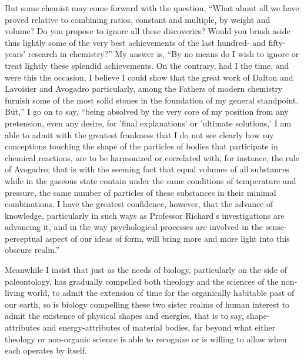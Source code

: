 \documentclass[a4paper, 11pt, oneside, polutonikogreek, english]{article}
\begin{document}
But some chemist may come forward with the question, ``What about all we have proved relative to combining ratios, constant and multiple, by weight and volume? Do you propose to ignore all these discoveries? Would you brush aside thus lightly some of the very best achievements of the last hundred- and fifty-years’ research in chemistry?'' My answer is, ``By no means do I wish to ignore or treat lightly these splendid achievements. On the contrary, had I the time, and were this the occasion, I believe I could show that the great work of Dalton and Lavoisier and Avogadro particularly, among the Fathers of modern chemistry furnish some of the most solid stones in the foundation of my general standpoint. But,'' I go on to say, ``being absolved by the very core of my position from any pretension, even any desire, for 'final explanations' or 'ultimate solutions,' I am able to admit with the greatest frankness that I do not see clearly how my conceptions touching the shape of the particles of bodies that participate in chemical reactions, are to be harmonized or correlated with, for instance, the rule of Avogadro; that is with the seeming fact that equal volumes of all substances while in the gaseous state contain under the same conditions of temperature and pressure, the same number of particles of these substances in their minimal combinations. I have the greatest confidence, however, that the advance of knowledge, particularly in such ways as Professor Richard's investigations are advancing it, and in the way psychological processes are involved in the sense-perceptual aspect of our ideas of form, will bring more and more light into this obscure realm.''

Meanwhile I insist that just as the needs of biology, particularly on the side of paleontology, has gradually compelled both theology and the sciences of the non-living world, to admit the extension of time for the organically habitable past of our earth, so is biology compelling these two sister realms of human interest to admit the existence of physical shapes and energies, that is to say, shape-attributes and energy-attributes of material bodies, far beyond what either theology or non-organic science is able to recognize or is willing to allow when each operates by itself.

\subsection{}
\end{document}
